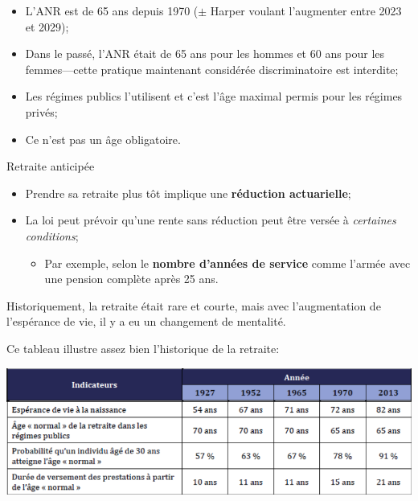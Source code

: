 \documentclass[10pt, french]{article}
\begin{document}
\begin{multicols*}{3}
\begin{definitionNOHFILL}
\begin{rappel_enhanced}[Historique]
\begin{itemize}[leftmargin = *]
	\item	L'ANR est de 65 ans depuis 1970 ($\pm$ Harper voulant l'augmenter entre 2023 et 2029);
	\item	Dans le passé, l'ANR était de 65 ans pour les hommes et 60 ans pour les femmes---cette pratique maintenant considérée discriminatoire est interdite;
	\item	Les régimes publics l'utilisent et c'est l'âge maximal permis pour les régimes privés;
	\item	Ce n'est pas un âge obligatoire.
\end{itemize}
\end{rappel_enhanced}

\begin{conceptgen}{Retraite anticipée}
\begin{itemize}[leftmargin = *]
	\item	Prendre sa retraite plus tôt implique une \textbf{réduction actuarielle};
	\item	La loi peut prévoir qu'une rente sans réduction peut être versée à \textit{certaines conditions};
		\begin{itemize}[leftmargin = *]
		\item	Par exemple, selon le \textbf{nombre d'années de service} comme l'armée avec une pension complète après 25 ans.
		\end{itemize}
\end{itemize}
\end{conceptgen} 
\end{definitionNOHFILL}

\begin{rappel_enhanced}
Historiquement, la retraite était rare et courte, mais avec l'augmentation de l'espérance de vie, il y a eu un changement de mentalité. 

Ce tableau illustre assez bien l'historique de la retraite:

\centerline{\includegraphics[scale=0.32]{src/ACT-1005/retraite-age-hist.png}}


\end{rappel_enhanced}
\end{multicols*}
\end{document}
